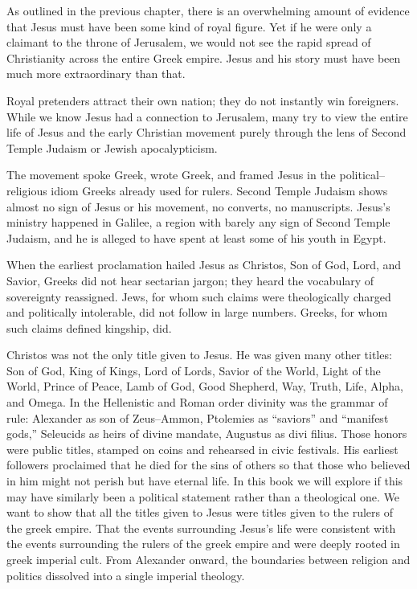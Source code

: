 As outlined in the previous chapter, there is an overwhelming amount of evidence that Jesus must have been some kind of royal figure.
Yet if he were only a claimant to the throne of Jerusalem, we would not see the rapid spread of Christianity across the entire Greek empire.
Jesus and his story must have been much more extraordinary than that.

Royal pretenders attract their own nation; they do not instantly win foreigners.
While we know Jesus had a connection to Jerusalem, many try to view the entire life of Jesus and the early Christian movement purely through the lens of Second Temple Judaism or Jewish apocalypticism.

The movement spoke Greek, wrote Greek, and framed Jesus in the political–religious idiom Greeks already used for rulers.
Second Temple Judaism shows almost no sign of Jesus or his movement, no converts, no manuscripts.
Jesus's ministry happened in Galilee, a region with barely any sign of Second Temple Judaism, and he is alleged to have spent at least some of his youth in Egypt.

When the earliest proclamation hailed Jesus as Christos, Son of God, Lord, and Savior, Greeks did not hear sectarian jargon; they heard the vocabulary of sovereignty reassigned.
Jews, for whom such claims were theologically charged and politically intolerable, did not follow in large numbers.
Greeks, for whom such claims defined kingship, did.

Christos was not the only title given to Jesus.
He was given many other titles: Son of God, King of Kings, Lord of Lords, Savior of the World, Light of the World, Prince of Peace, Lamb of God, Good Shepherd, Way, Truth, Life, Alpha, and Omega.
In the Hellenistic and Roman order divinity was the grammar of rule: Alexander as son of Zeus–Ammon, Ptolemies as “saviors” and “manifest gods,” Seleucids as heirs of divine mandate, Augustus as divi filius.
Those honors were public titles, stamped on coins and rehearsed in civic festivals.
His earliest followers proclaimed that he died for the sins of others so that those who believed in him might not perish but have eternal life.
In this book we will explore if this may have similarly been a political statement rather than a theological one.
We want to show that all the titles given to Jesus were titles given to the rulers of the greek empire.
That the events surrounding Jesus’s life were consistent with the events surrounding the rulers of the greek empire and were deeply rooted in greek imperial cult.
From Alexander onward, the boundaries between religion and politics dissolved into a single imperial theology.

